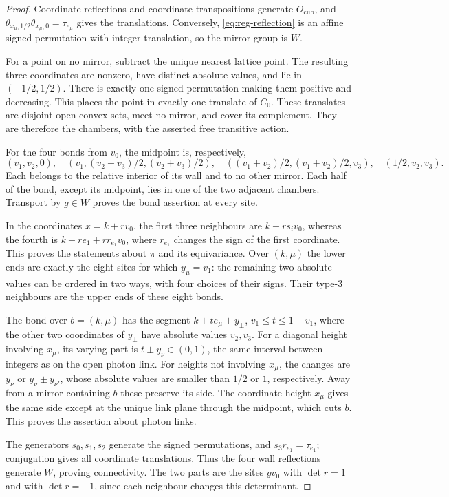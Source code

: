 \documentclass[11pt,letterpaper,reqno]{amsart}
\begin{document}
\begin{proof}
Coordinate reflections and coordinate transpositions generate
$O_{\mathrm{cub}}$, and
$\theta_{x_\mu,1/2}\theta_{x_\mu,0}=\tau_{e_\mu}$ gives the
translations. Conversely, \eqref{eq:reg-reflection} is an affine signed
permutation with integer translation, so the mirror group is $W$.

For a point on no mirror, subtract the unique nearest lattice point.
The resulting three coordinates are nonzero, have distinct absolute
values, and lie in $(-1/2,1/2)$. There is exactly one signed
permutation making them positive and decreasing. This places the
point in exactly one translate of $C_0$. These translates are disjoint
open convex sets, meet no mirror, and cover its complement. They are
therefore the chambers, with the asserted free transitive action.

For the four bonds from $v_0$, the midpoint is, respectively,
\[
 (v_1,v_2,0),\quad
 (v_1,(v_2+v_3)/2,(v_2+v_3)/2),\quad
 ((v_1+v_2)/2,(v_1+v_2)/2,v_3),\quad
 (1/2,v_2,v_3).
\]
Each belongs to the relative interior of its wall and to no other
mirror. Each half of the bond, except its midpoint, lies in one of
the two adjacent chambers. Transport by $g\in W$ proves the bond
assertion at every site.

In the coordinates $x=k+rv_0$, the first three neighbours are
$k+rs_iv_0$, whereas the fourth is
$k+re_1+rr_{e_1}v_0$, where $r_{e_1}$ changes the sign of the first
coordinate. This proves the statements about $\pi$ and its
equivariance. Over $(k,\mu)$ the lower ends are exactly the eight
sites for which $y_\mu=v_1$: the remaining two absolute values can
be ordered in two ways, with four choices of their signs. Their
type-$3$ neighbours are the upper ends of these eight bonds.

The bond over $b=(k,\mu)$ has the segment
$k+te_\mu+y_\perp$, $v_1\le t\le1-v_1$, where the other two
coordinates of $y_\perp$ have absolute values $v_2,v_3$. For a
diagonal height involving $x_\mu$, its varying part is
$t\pm y_\nu\in(0,1)$, the same interval between integers as on the
open photon link. For heights not involving $x_\mu$, the changes
are $y_\nu$ or $y_\nu\pm y_{\nu'}$, whose absolute values are
smaller than $1/2$ or $1$, respectively. Away from a mirror
containing $b$ these preserve its side. The coordinate height
$x_\mu$ gives the same side except at the unique link plane through
the midpoint, which cuts $b$. This proves the assertion about
photon links.

The generators $s_0,s_1,s_2$ generate the signed permutations, and
$s_3r_{e_1}=\tau_{e_1}$; conjugation gives all coordinate translations.
Thus the four wall reflections generate $W$, proving connectivity.
The two parts are the sites $gv_0$ with $\det r=1$ and with
$\det r=-1$, since each neighbour changes this determinant.
\end{proof}
\end{document}
